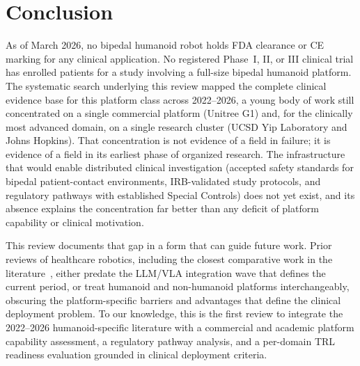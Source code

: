 ﻿%
\section{Conclusion}
\label{sec:conclusion}

As of March 2026, no bipedal humanoid robot holds FDA clearance or CE marking for
any clinical application. No registered Phase~I, II, or III clinical trial has
enrolled patients for a study involving a full-size bipedal humanoid platform. The
systematic search underlying this review mapped the complete clinical evidence
base for this platform class across 2022--2026, a young body of work still
concentrated on a
single commercial platform (Unitree G1) and, for the clinically most advanced
domain, on a single research cluster (UCSD Yip Laboratory and Johns Hopkins). That
concentration is not evidence of a field in failure; it is evidence of a field in
its earliest phase of organized research. The infrastructure that would enable
distributed clinical investigation (accepted safety standards for bipedal
patient-contact environments, IRB-validated study protocols, and regulatory
pathways with established Special Controls) does not yet exist, and its absence
explains the concentration far better than any deficit of platform capability or
clinical motivation.

This review documents that gap in a form that can guide future work. Prior
reviews of healthcare robotics, including the
closest comparative work in the literature~\cite{cunha2025humanoid}, either
predate the LLM/VLA integration wave that defines the current period, or treat
humanoid and non-humanoid platforms interchangeably,
obscuring the platform-specific barriers and advantages that define the clinical
deployment problem. To our knowledge, this is the first review to integrate the
2022--2026 humanoid-specific literature with a commercial and academic platform
capability assessment, a regulatory pathway analysis, and a per-domain TRL
readiness evaluation grounded in clinical deployment criteria.

